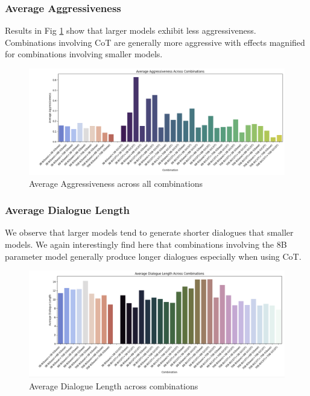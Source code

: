 \documentclass[11pt]{article}
\begin{document}
\subsubsection{Average Aggressiveness}
Results in Fig \ref{fig:avg_agg} show that larger models exhibit less aggressiveness. Combinations involving CoT are generally more aggressive with effects magnified for combinations involving smaller models. 
\begin{figure}[h]
    \centering
    \includegraphics[width=1\linewidth]{figures/scale_cot/avg_aggressiveness_size_cot.png}
    \caption{Average Aggressiveness across all combinations}
    \label{fig:avg_agg}
\end{figure}

\subsubsection{Average Dialogue Length}
We observe that larger models tend to generate shorter dialogues that smaller models. We again interestingly find here that combinations involving the 8B parameter model generally produce longer dialogues especially when using CoT.
\begin{figure}[h]
    \centering
    \includegraphics[width=1\linewidth]{figures/scale_cot/dialogue_length_size_cot.png}
    \caption{Average Dialogue Length across combinations}
    \label{fig:dialogue_length}
\end{figure}
\end{document}
